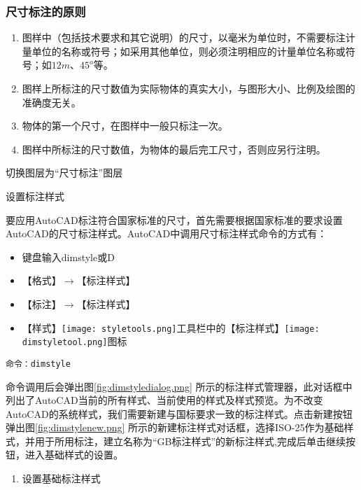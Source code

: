 \subsubsection{尺寸标注的原则}
\begin{enumerate}
\item 图样中（包括技术要求和其它说明）的尺寸，以毫米为单位时，不需要标注计量单位的名称或符号；如采用其他单位，则必须注明相应的计量单位名称或符号；如$12m$、$45^o$等。
\item 图样上所标注的尺寸数值为实际物体的真实大小，与图形大小、比例及绘图的准确度无关。
\item 物体的第一个尺寸，在图样中一般只标注一次。
\item 图样中所标注的尺寸数值，为物体的最后完工尺寸，否则应另行注明。
\end{enumerate}
\begin{procedure}
\item 切换图层为“尺寸标注”图层
\item 设置标注样式

要应用AutoCAD标注符合国家标准的尺寸，首先需要根据国家标准的要求设置AutoCAD的尺寸标注样式。AutoCAD中调用尺寸标注样式命令的方式有：
\begin{itemize}
\item 键盘输入dimstyle或D
\item 【格式】$\rightarrow$【标注样式】
\item 【标注】$\rightarrow$【标注样式】
\item 【样式】\texttt{[image: styletools.png]}工具栏中的【标注样式】\texttt{[image: dimstyletool.png]}图标
\end{itemize}

\begin{lstlisting}
命令：dimstyle
\end{lstlisting}

命令调用后会弹出图\ref{fig:dimstyledialog.png} 所示的标注样式管理器，此对话框中列出了AutoCAD当前的所有样式、当前使用的样式及样式预览。为不改变AutoCAD的系统样式，我们需要新建与国标要求一致的标注样式。点击新建按钮弹出图\ref{fig:dimstylenew.png} 所示的新建标注样式对话框，选择ISO-25作为基础样式，并用于所用标注，建立名称为“GB标注样式”的新标注样式,完成后单击继续按钮，进入基础样式的设置。
\begin{figure}[htbp]
\centering
\begin{floatrow}[2]
\end{floatrow}
\end{figure}
\begin{enumerate}
\item 设置基础标注样式


\end{enumerate}
\end{procedure}
